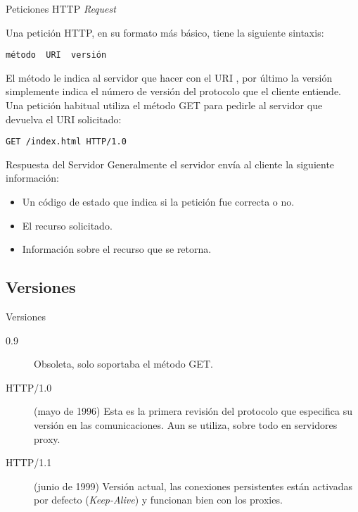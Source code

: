 
\begin{frame}[fragile]{Peticiones HTTP \textit{Request}} %

    Una petición HTTP, en su formato más básico, tiene la siguiente sintaxis:
    \begin{verbatim}
método  URI  versión
    \end{verbatim}

    El método le indica al servidor que hacer con el URI , por último la
    versión simplemente indica el número de versión del protocolo que el
    cliente entiende. Una petición habitual utiliza el método GET para pedirle
    al servidor que devuelva el URI solicitado:
    
    \begin{verbatim}
GET /index.html HTTP/1.0
    \end{verbatim}
    
\end{frame}

\begin{frame}{Respuesta del Servidor} %
    Generalmente el servidor envía al cliente la siguiente información: 

    \begin{itemize}
        \item Un código de estado que indica si la petición fue correcta o no. 
        \item El recurso solicitado. 
        \item Información sobre el recurso que se retorna. 
    \end{itemize}
\end{frame}

\subsection{Versiones} %

\begin{frame}{Versiones} %
    \begin{description}
        \item[0.9] Obsoleta, solo soportaba el método GET. 
        \item[HTTP/1.0] (mayo de 1996) Esta es la primera revisión del
        protocolo que especifica su versión en las comunicaciones. Aun se
        utiliza, sobre todo en servidores proxy. 
        \item[HTTP/1.1] (junio de 1999) Versión actual, las conexiones
        persistentes están activadas por defecto (\textit{Keep-Alive}) y funcionan bien con los
        proxies. 
    \end{description}
\end{frame}

